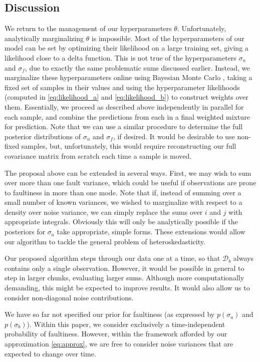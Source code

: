 \documentclass{article}
\newcommand{\cm}[1]{\ensuremath{\mathcal{#1}}}
\newcommand{\data}{\ensuremath{\cm{D}}}
\begin{document}
\subsection{Discussion}

We return to the management of our hyperparameters
$\theta$. Unfortunately, analytically marginalizing $\theta$ is
impossible. Most of the hyperparameters of our model can be set by
optimizing their likelihood on a large training set, giving a
likelihood close to a delta function. This is not true of the
hyperparameters $\sigma_n$ and $\sigma_f$, due to exactly the same
problematic sums discussed earlier. Instead, we marginalize these
hyperparameters online using Bayesian Monte Carlo \citep[Chapter
  7]{osbornebayesian}, taking a fixed set of samples in their values
and using the hyperparameter likelihoods (computed in
\eqref{eq:likelihood_a} and \eqref{eq:likelihood_b}) to construct
weights over them. Essentially, we proceed as described above
independently in parallel for each sample, and combine the predictions
from each in a final weighted mixture for prediction. Note that we can
use a similar procedure \citep{garnettosborne} to determine the full
posterior distributions of $\sigma_n$ and $\sigma_f$, if desired.  It
would be desirable to use non-fixed samples, but, unfortunately, this
would require reconstructing our full covariance matrix from
scratch each time a sample is moved.

The proposal above can be extended in several ways. First, we may wish
to sum over more than one fault variance, which could be useful if
observations are prone to faultiness in more than one mode.  Note that
if, instead of summing over a small number of known variances, we
wished to marginalize with respect to a density over noise variance,
we can simply replace the sums over $i$ and $j$ with appropriate
integrals. Obviously this will only be analytically possible if the
posteriors for $\sigma_a$ take appropriate, simple forms.  These
extensions would allow our algorithm to tackle the general problem of
heteroskedasticity.

Our proposed algorithm steps through our data one at a time, so that
$\data_b$ always contains only a single observation. However, it would
be possible in general to step in larger chunks, evaluating larger
sums. Although more computationally demanding, this might be expected
to improve results. It would also allow us to consider non-diagonal
noise contributions.

We have so far not specified our prior for faultiness (as expressed by
$p(\sigma_a)$ and $p(\sigma_b)$). Within this paper, we consider
exclusively a time-independent probability of faultiness. However,
within the framework afforded by our approximation \eqref{eq:approx},
we are free to consider noise variances that are expected to change
over time.
\end{document}
